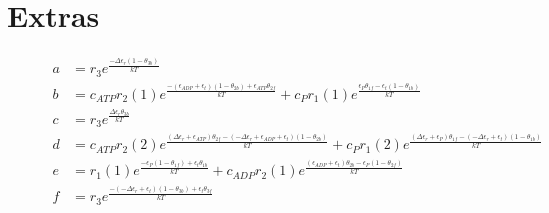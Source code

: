 \documentclass[11pt]{article}
\begin{document}
\section{Extras}
\begin{figure}[H]
	\begin{align}
		a & = r_3 e^{\frac{ - \Delta\epsilon_{r} \left( 1 - \theta_{3b} \right)}{kT}}                                                                                                                                                                                                                                                                                                                  \\
		b & = c_{ATP} r_{2}(1) e^{\frac{ - \left( {\epsilon}_{ADP} + \epsilon_{t} \right) \left( 1 - \theta_{2b} \right) + {\epsilon}_{ATP} \theta_{2f}}{kT}} + c_P r_{1}(1) e^{\frac{{\epsilon}_P \theta_{1f} - \epsilon_{t} \left( 1 - \theta_{1b} \right)}{kT}}                                                                                                                                     \\
		c & = r_3 e^{\frac{\Delta\epsilon_{r} \theta_{3b}}{kT}}                                                                                                                                                                                                                                                                                                                                        \\
		d & = c_{ATP} r_{2}(2) e^{\frac{\left( \Delta\epsilon_{r} + {\epsilon}_{ATP} \right) \theta_{2f} - \left(  - \Delta\epsilon_{r} + {\epsilon}_{ADP} + \epsilon_{t} \right) \left( 1 - \theta_{2b} \right)}{kT}} + c_P r_{1}(2) e^{\frac{\left( \Delta\epsilon_{r} + {\epsilon}_P \right) \theta_{1f} - \left(  - \Delta\epsilon_{r} + \epsilon_{t} \right) \left( 1 - \theta_{1b} \right)}{kT}} \\
		e & = r_{1}(1) e^{\frac{ - {\epsilon}_P \left( 1 - \theta_{1f} \right) + \epsilon_{t} \theta_{1b}}{kT}} + c_{ADP} r_{2}(1) e^{\frac{\left( {\epsilon}_{ADP} + \epsilon_{t} \right) \theta_{2b} - {\epsilon}_P \left( 1 - \theta_{2f} \right)}{kT}}                                                                                                                                             \\
		f & = r_3 e^{\frac{ - \left(  - \Delta\epsilon_{r} + \epsilon_{t} \right) \left( 1 - \theta_{3b} \right) + \epsilon_{t} \theta_{3f}}{kT}}                                                                                                                                                                                                                                                      \\

\end{align}
\end{figure}
\end{document}
